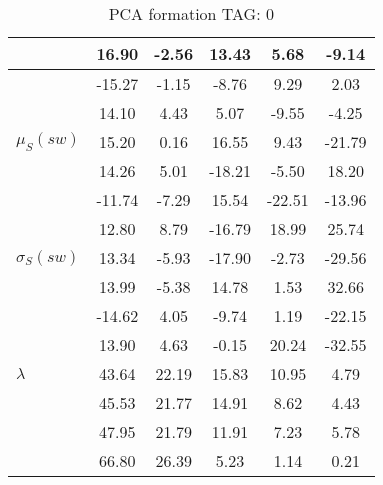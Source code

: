 \begin{table}[h!]
\begin{center}
\begin{tabular}{| l | c | c | c | c | c |}
 & 16.90  & -2.56  & 13.43  & 5.68  & -9.14 \\\hline
 & -15.27  & -1.15  & -8.76  & 9.29  & 2.03 \\\hline
 & 14.10  & 4.43  & 5.07  & -9.55  & -4.25 \\\hline
$\mu_S(sw)$ & 15.20  & 0.16  & 16.55  & 9.43  & -21.79 \\\hline
 & 14.26  & 5.01  & -18.21  & -5.50  & 18.20 \\\hline
 & -11.74  & -7.29  & 15.54  & -22.51  & -13.96 \\\hline
 & 12.80  & 8.79  & -16.79  & 18.99  & 25.74 \\\hline
$\sigma_S(sw)$ & 13.34  & -5.93  & -17.90  & -2.73  & -29.56 \\\hline
 & 13.99  & -5.38  & 14.78  & 1.53  & 32.66 \\\hline
 & -14.62  & 4.05  & -9.74  & 1.19  & -22.15 \\\hline
 & 13.90  & 4.63  & -0.15  & 20.24  & -32.55 \\\hline
$\lambda$ & 43.64  & 22.19  & 15.83  & 10.95  & 4.79 \\\hline
 & 45.53  & 21.77  & 14.91  & 8.62  & 4.43 \\\hline
 & 47.95  & 21.79  & 11.91  & 7.23  & 5.78 \\\hline
 & 66.80  & 26.39  & 5.23  & 1.14  & 0.21 \\\hline
\end{tabular}
\caption{PCA formation TAG: 0}
\end{center}
\end{table}